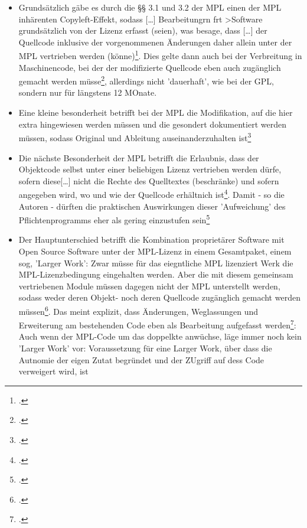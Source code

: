 \documentclass[DIV=calc,BCOR=5mm,11pt,headings=small,oneside,abstract=true, toc=bib]{scrartcl}
\begin{document}
\begin{itemize}
  \item Grundsätzlich gäbe es durch die §§ 3.1 und 3.2 der MPL einen der MPL
  \glqq{}inhärenten Copyleft-Effekt\grqq{}, sodass \glqq{}[\ldots]
  Bearbeitungrn frt >Software grundsätzlich von der Lizenz erfasst
  (seien)\grqq{}, was besage, dass \glqq{}[\ldots] der Quellcode
  inklusive der vorgenommenen Änderungen daher allein unter der MPL
  vertrieben werden (könne)\grqq{}\footcite[vgl.][349]{ArlBriVol2004a}. Dies
  gelte dann auch bei der Verbreitung in Maschinencode, bei der der modifizierte
  Quellcode eben auch \glqq{}zugänglich\grqq{} gemacht werden
  müsse\footcite[vgl.][349]{ArlBriVol2004a}, allerdings nicht 'dauerhaft', wie
  bei der GPL, sondern nur für \glqq{}längstens\grqq{} 12 MOnate.
  \item Eine kleine besonderheit betrifft bei der MPL die Modifikation, auf die
  hier extra hingewiesen werden müssen und die gesondert dokumentiert werden
  müssen, sodass Original und Ableitung auseinanderzuhalten
  ist\footcite[vgl.][350]{ArlBriVol2004a}
  \item Die nächste Besonderheit der MPL betrifft die Erlaubnis, dass der
  Objektcode selbst unter einer beliebigen Lizenz vertrieben werden dürfe,
  sofern diese\glqq{}[\ldots] nicht die Rechte des Quelltextes
  (beschränke)\grqq{} und sofern angegeben wird, wo und wie der Quellcode
  erhältnich ist\footcite[vgl.][350]{ArlBriVol2004a}. Damit - so die Autoren -
 \glqq{}dürften die praktischen Auswirkungen dieser 'Aufweichung' des
 Pflichtenprogramms eher als gering einzustufen
 sein\grqq{}\footcite[vgl.][351]{ArlBriVol2004a}
 \item Der Hauptunterschied betrifft die \glqq{}Kombination proprietärer
 Software mit Open Source Software unter der MPL-Lizenz in einem
 Gesamtpaket, einem sog, 'Larger Work'\grqq{}: Zwar müsse für das eiegntliche
 MPL lizenziert Werk die MPL-Lizenzbedingung eingehalten werden. Aber
 \glqq{}die mit diesem gemeinsam vertriebenen Module müssen dagegen nicht
 der MPL unterstellt werden, sodass weder deren Objekt- noch deren
 Quellcode zugänglich gemacht werden
 müssen\grqq{}\footcite[vgl.][352]{ArlBriVol2004a}. Das meint explizit, dass
 Änderungen, Weglassungen und Erweiterung am bestehenden Code eben als
 \glqq{}Bearbeitung\grqq{} aufgefasst
 werden\footcite[vgl.][354]{ArlBriVol2004a}: Auch wenn der MPL-Code um das
 doppelkte anwüchse, läge immer noch kein 'Larger Work' vor:
 \glqq{}Voraussetzung\grqq{} für eine Larger Work, über dass die Autnomie der
 eigen Zutat begründet und der ZUgriff auf dess Code verweigert wird, ist

\end{itemize}
\end{document}

